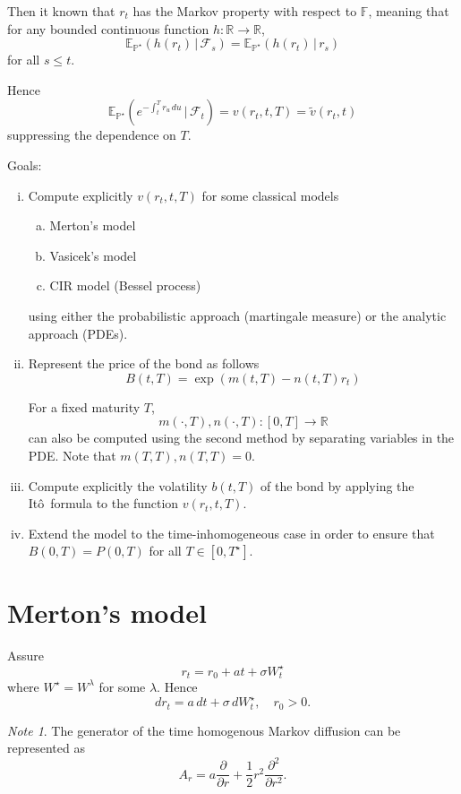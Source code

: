 \documentclass[10pt, oneside, reqno]{amsbook}
\theoremstyle{plain}%
\theoremstyle{definition}
\theoremstyle{remark}
\newtheorem*{note}{Note}
\newcommand{\given}{ \, | \,}
\newcommand{\sigf}{\mathcal{F}}
\newcommand{\R}{\mathbb{R}}
\newcommand{\E}{\mathbb{E}}
\renewcommand{\P}{\mathbb{P}}
\newcommand{\F}{\mathbb{F}}
\newcommand{\ito}{It\^o\ }
\numberwithin{equation}{chapter}
\begin{document}
    Then it known that $r_t$ has the Markov property with respect to $\F$, meaning that for any bounded continuous function $h : \R \rightarrow \R$, \[
    \E_{\P^\star} \left(h(r_t) \given \sigf_s \right) = \E_{\P^\star}\left(h(r_t) \given r_s \right)
 \] for all $s \leq t$.   

Hence \[
    \E_{\P^\star} \left(e^{-\int_t^T r_u \, du} \given \sigf_t \right) = v(r_t, t, T) = \tilde v(r_t, t) 
\] suppressing the dependence on $T$.

Goals:
\begin{enumerate}[(i)]
    \item Compute explicitly $v(r_t, t, T)$ for some classical models \begin{enumerate}[(a)]
        \item Merton's model 
        \item Vasicek's model
        \item CIR model (Bessel process)
    \end{enumerate}
    using either the probabilistic approach (martingale measure) or the  analytic approach (PDEs).
    \item Represent the price of the bond as follows \[
        B(t, T) = \exp \left( m(t, T) - n(t, T) r_t \right)
    \]
    
    For a fixed maturity $T$, \[
        m(\cdot, T), n(\cdot, T) : [0, T] \rightarrow \R
    \] can also be computed using the second method by separating variables in the PDE.  Note that $m(T, T), n(T, T) = 0$.
    \item Compute explicitly the volatility $b(t, T)$ of the bond by applying the \ito formula to the function $v(r_t, t, T)$.
    \item Extend the model to the time-inhomogeneous case in order to ensure that $B(0, T) = P(0, T)$ for all $T \in [0, T^\star]$.
\end{enumerate}

\section{Merton's model} %
\label{sub:merton_s_model}
    Assure \[
        r_t = r_0 + at + \sigma W_t^\star 
    \] where $W^\star = W^\lambda$ for some $\lambda$.  Hence
    \begin{equation}
        dr_t = a \, dt + \sigma \, dW^\star_t, \quad r_0 > 0.
    \end{equation} 
    \begin{note}
        The generator of the time homogenous Markov diffusion can be represented as \[
            A_r = a \frac{\partial }{\partial r} + \frac{1}{2} r^2 \frac{\partial^2}{\partial r^2}.  
        \]
    \end{note}
\end{document}
